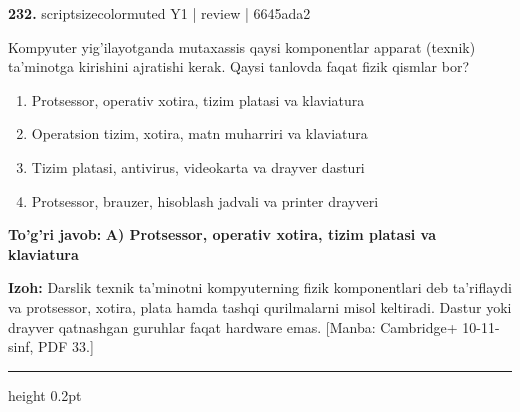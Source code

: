 \documentclass[10pt,a4paper]{article}
\begin{document}
{\bfseries\sffamily\color{ink} 232.} {scriptsizecolor{muted} Y1 | review | 6645ada2}
\par
Kompyuter yig'ilayotganda mutaxassis qaysi komponentlar apparat (texnik) ta'minotga kirishini ajratishi kerak. Qaysi tanlovda faqat fizik qismlar bor?
\begin{enumerate}[label=\Alph*),leftmargin=9mm]
\item Protsessor, operativ xotira, tizim platasi va klaviatura
\item Operatsion tizim, xotira, matn muharriri va klaviatura
\item Tizim platasi, antivirus, videokarta va drayver dasturi
\item Protsessor, brauzer, hisoblash jadvali va printer drayveri
\end{enumerate}
\begin{tcolorbox}[enhanced,breakable,colback=teal!4,colframe=teal!60!black,boxrule=0.45pt,arc=1.2mm,left=2.7mm,right=2.7mm,top=1.8mm,bottom=1.8mm,before skip=2mm,after skip=2mm]
{\bfseries\sffamily\color{teal}To'g'ri javob:} \textbf{A) Protsessor, operativ xotira, tizim platasi va klaviatura}
\par\smallskip
{\bfseries Izoh:} Darslik texnik ta'minotni kompyuterning fizik komponentlari deb ta'riflaydi va protsessor, xotira, plata hamda tashqi qurilmalarni misol keltiradi. Dastur yoki drayver qatnashgan guruhlar faqat hardware emas. [Manba: Cambridge+ 10-11-sinf, PDF 33.]
\end{tcolorbox}
\vspace{2mm}\hrule height 0.2pt\vspace{3mm}
\end{document}
